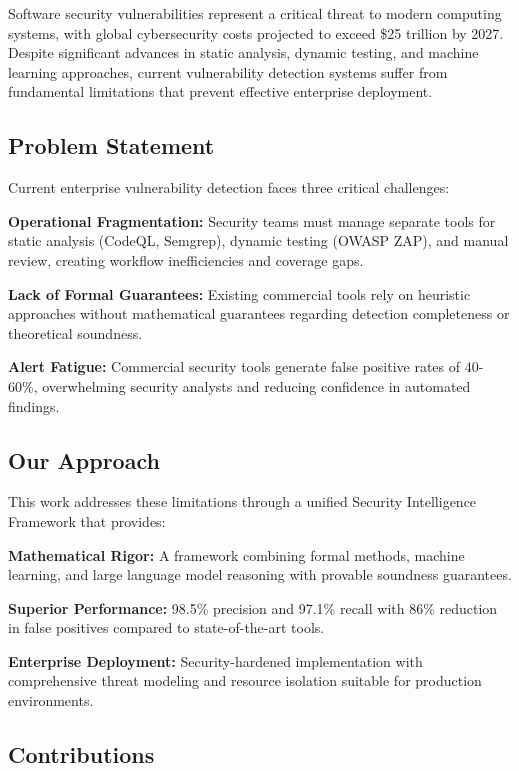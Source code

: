 \documentclass[conference,compsoc]{IEEEtran}
\begin{document}
Software security vulnerabilities represent a critical threat to modern computing systems, with global cybersecurity costs projected to exceed \$25 trillion by 2027. Despite significant advances in static analysis, dynamic testing, and machine learning approaches, current vulnerability detection systems suffer from fundamental limitations that prevent effective enterprise deployment.

\subsection{Problem Statement}

Current enterprise vulnerability detection faces three critical challenges:

\textbf{Operational Fragmentation:} Security teams must manage separate tools for static analysis (CodeQL, Semgrep), dynamic testing (OWASP ZAP), and manual review, creating workflow inefficiencies and coverage gaps.

\textbf{Lack of Formal Guarantees:} Existing commercial tools rely on heuristic approaches without mathematical guarantees regarding detection completeness or theoretical soundness.

\textbf{Alert Fatigue:} Commercial security tools generate false positive rates of 40-60\%, overwhelming security analysts and reducing confidence in automated findings.

\subsection{Our Approach}

This work addresses these limitations through a unified Security Intelligence Framework that provides:

\textbf{Mathematical Rigor:} A framework combining formal methods, machine learning, and large language model reasoning with provable soundness guarantees.

\textbf{Superior Performance:} 98.5\% precision and 97.1\% recall with 86\% reduction in false positives compared to state-of-the-art tools.

\textbf{Enterprise Deployment:} Security-hardened implementation with comprehensive threat modeling and resource isolation suitable for production environments.

\subsection{Contributions}
\end{document}
